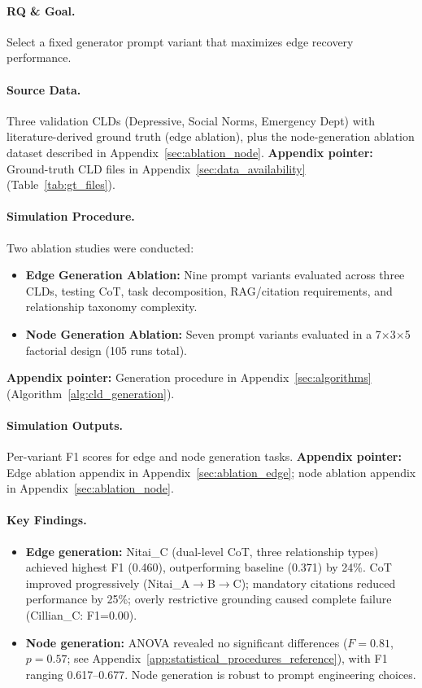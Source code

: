 \paragraph{RQ \& Goal.}
Select a fixed generator prompt variant that maximizes edge recovery performance.

\paragraph{Source Data.}
Three validation CLDs (Depressive, Social Norms, Emergency Dept) with literature-derived ground truth (edge ablation), plus the node-generation ablation dataset described in Appendix~\ref{sec:ablation_node}.
\textbf{Appendix pointer:} Ground-truth CLD files in Appendix~\ref{sec:data_availability} (Table~\ref{tab:gt_files}).

\paragraph{Simulation Procedure.}
Two ablation studies were conducted:
\begin{itemize}[noitemsep]
    \item \textbf{Edge Generation Ablation:} Nine prompt variants evaluated across three CLDs, testing CoT, task decomposition, RAG/citation requirements, and relationship taxonomy complexity.
    \item \textbf{Node Generation Ablation:} Seven prompt variants evaluated in a 7$\times$3$\times$5 factorial design (105 runs total).
\end{itemize}
\textbf{Appendix pointer:} Generation procedure in Appendix~\ref{sec:algorithms} (Algorithm~\ref{alg:cld_generation}).

\paragraph{Simulation Outputs.}
Per-variant F1 scores for edge and node generation tasks.
\textbf{Appendix pointer:} Edge ablation appendix in Appendix~\ref{sec:ablation_edge}; node ablation appendix in Appendix~\ref{sec:ablation_node}.

\paragraph{Key Findings.}
\begin{itemize}[noitemsep]
    \item \textbf{Edge generation:} Nitai\_C (dual-level CoT, three relationship types) achieved highest F1 (0.460), outperforming baseline (0.371) by 24\%. CoT improved progressively (Nitai\_A$\rightarrow$B$\rightarrow$C); mandatory citations reduced performance by 25\%; overly restrictive grounding caused complete failure (Cillian\_C: F1=0.00).
    \item \textbf{Node generation:} ANOVA revealed no significant differences ($F=0.81$, $p=0.57$; see Appendix~\ref{app:statistical_procedures_reference}), with F1 ranging 0.617--0.677. Node generation is robust to prompt engineering choices.
\end{itemize}

